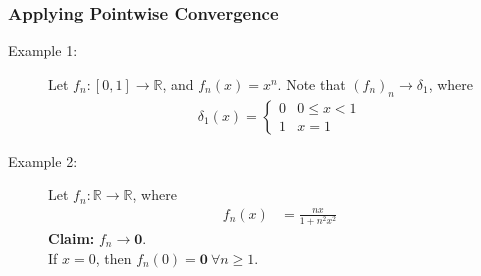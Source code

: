 \documentclass[10pt]{extarticle}
\renewcommand{\mathbf}[1]{\mathbold{#1}}
\newcommand{\R}{\mathbb{R}}
\begin{document}
    \subsubsection{Applying Pointwise Convergence}%
    \begin{description}
      \item[Example 1:] Let $f_n: [0,1]\rightarrow\R$, and $f_n(x) = x^n$. Note that $(f_n)_n\rightarrow \delta_1$, where
        \begin{align*}
          \delta_1(x) = \begin{cases}
            0&0\leq x < 1\\
            1&x = 1
          \end{cases}
        \end{align*}
      \item[Example 2:] Let $f_n: \R \rightarrow \R$, where
        \begin{align*}
          f_n(x) &= \frac{nx}{1 + n^2x^2}
        \end{align*}
        \textbf{Claim:} $f_n \rightarrow \mathbf{0}$.\\

        If $x = 0$, then $f_n(0) = \mathbf{0}~\forall n\geq 1$.\\


\end{description}
\end{document}
